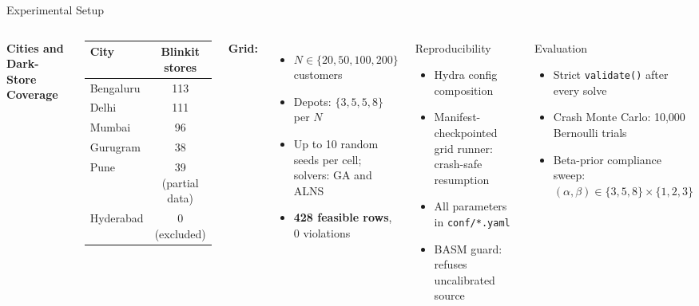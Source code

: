 \documentclass[aspectratio=169,t]{beamer}
\begin{document}
\begin{frame}{Experimental Setup}
\begin{columns}[T]
  \textbf{Cities and Dark-Store Coverage}
  \begin{center}
  \scriptsize
  \begin{tabular}{lc}
  \toprule
  City & Blinkit stores \\
  \midrule
  Bengaluru & 113 \\
  Delhi     & 111 \\
  Mumbai    &  96 \\
  Gurugram  &  38 \\
  \midrule
  Pune      &  39 (partial data) \\
  Hyderabad &   0 (excluded) \\
  \bottomrule
  \end{tabular}
  \end{center}
  \vspace{2pt}
  \normalsize
  \textbf{Grid:}
  \scriptsize
  \begin{itemize}
    \item $N \in \{20, 50, 100, 200\}$ customers
    \item Depots: $\{3, 5, 5, 8\}$ per $N$
    \item Up to 10 random seeds per cell; solvers: GA and ALNS
    \item \textbf{428 feasible rows}, 0 violations
  \end{itemize}
  \begin{block}{Reproducibility}
    \scriptsize
    \begin{itemize}
      \item Hydra config composition
      \item Manifest-checkpointed grid runner: crash-safe resumption
      \item All parameters in \texttt{conf/*.yaml}
      \item BASM guard: refuses uncalibrated source
    \end{itemize}
  \end{block}
  \vspace{2pt}
  \begin{block}{Evaluation}
    \scriptsize
    \begin{itemize}
      \item Strict \texttt{validate()} after every solve
      \item Crash Monte Carlo: 10{,}000 Bernoulli trials
      \item Beta-prior compliance sweep: $(\alpha,\beta)\in\{3,5,8\}\times\{1,2,3\}$
    \end{itemize}
  \end{block}
\end{columns}
\end{frame}
\end{document}
